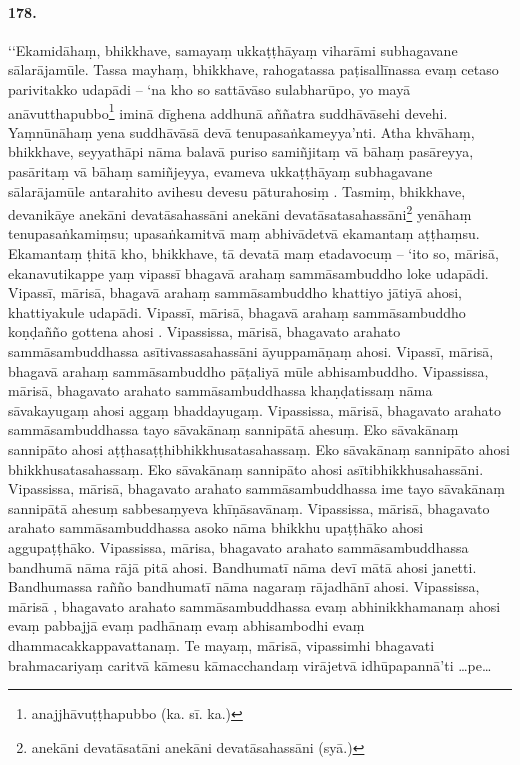 \paragraph{178.} ‘‘Ekamidāhaṃ, bhikkhave, samayaṃ ukkaṭṭhāyaṃ viharāmi subhagavane sālarājamūle. Tassa mayhaṃ, bhikkhave, rahogatassa paṭisallīnassa evaṃ cetaso parivitakko udapādi – ‘na kho so sattāvāso sulabharūpo, yo mayā anāvutthapubbo\footnote{anajjhāvuṭṭhapubbo (ka. sī. ka.)} iminā dīghena addhunā aññatra suddhāvāsehi devehi. Yaṃnūnāhaṃ yena suddhāvāsā devā tenupasaṅkameyya’nti. Atha khvāhaṃ, bhikkhave, seyyathāpi nāma balavā puriso samiñjitaṃ vā bāhaṃ pasāreyya, pasāritaṃ vā bāhaṃ samiñjeyya, evameva ukkaṭṭhāyaṃ subhagavane sālarājamūle antarahito avihesu devesu pāturahosiṃ . Tasmiṃ, bhikkhave, devanikāye anekāni devatāsahassāni anekāni devatāsatasahassāni\footnote{anekāni devatāsatāni anekāni devatāsahassāni (syā.)} yenāhaṃ tenupasaṅkamiṃsu; upasaṅkamitvā maṃ abhivādetvā ekamantaṃ aṭṭhaṃsu. Ekamantaṃ ṭhitā kho, bhikkhave, tā devatā maṃ etadavocuṃ – ‘ito so, mārisā, ekanavutikappe yaṃ vipassī bhagavā arahaṃ sammāsambuddho loke udapādi. Vipassī, mārisā, bhagavā arahaṃ sammāsambuddho khattiyo jātiyā ahosi, khattiyakule udapādi. Vipassī, mārisā, bhagavā arahaṃ sammāsambuddho koṇḍañño gottena ahosi . Vipassissa, mārisā, bhagavato arahato sammāsambuddhassa asītivassasahassāni āyuppamāṇaṃ ahosi. Vipassī, mārisā, bhagavā arahaṃ sammāsambuddho pāṭaliyā mūle abhisambuddho. Vipassissa, mārisā, bhagavato arahato sammāsambuddhassa khaṇḍatissaṃ nāma sāvakayugaṃ ahosi aggaṃ bhaddayugaṃ. Vipassissa, mārisā, bhagavato arahato sammāsambuddhassa tayo sāvakānaṃ sannipātā ahesuṃ. Eko sāvakānaṃ sannipāto ahosi aṭṭhasaṭṭhibhikkhusatasahassaṃ. Eko sāvakānaṃ sannipāto ahosi bhikkhusatasahassaṃ. Eko sāvakānaṃ sannipāto ahosi asītibhikkhusahassāni. Vipassissa, mārisā, bhagavato arahato sammāsambuddhassa ime tayo sāvakānaṃ sannipātā ahesuṃ sabbesaṃyeva khīṇāsavānaṃ. Vipassissa, mārisā, bhagavato arahato sammāsambuddhassa asoko nāma bhikkhu upaṭṭhāko ahosi aggupaṭṭhāko. Vipassissa, mārisa, bhagavato arahato sammāsambuddhassa bandhumā nāma rājā pitā ahosi. Bandhumatī nāma devī mātā ahosi janetti. Bandhumassa rañño bandhumatī nāma nagaraṃ rājadhānī ahosi. Vipassissa, mārisā , bhagavato arahato sammāsambuddhassa evaṃ abhinikkhamanaṃ ahosi evaṃ pabbajjā evaṃ padhānaṃ evaṃ abhisambodhi evaṃ dhammacakkappavattanaṃ. Te mayaṃ, mārisā, vipassimhi bhagavati brahmacariyaṃ caritvā kāmesu kāmacchandaṃ virājetvā idhūpapannā’ti …pe…

